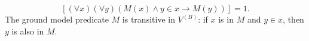$$[(\forall x)(\forall y)(M(x) \land y \in x \rightarrow M(y))] = 1.$$
The ground model predicate $M$ is transitive in $V^{(B)}$: if $x$ is in $M$ and $y \in x$, then $y$ is also in $M$.
